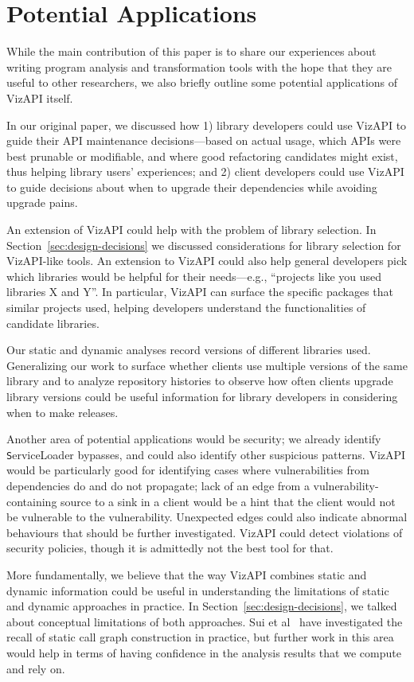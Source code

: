 \section{Potential Applications}
\label{sec:potential-applications}
While the main contribution of this paper is to share our experiences
about writing program analysis and transformation tools with the hope
that they are useful to other researchers, we also briefly outline
some potential applications of VizAPI itself.

In our original paper, we discussed how 1) library developers could
use VizAPI to guide their API maintenance decisions---based on actual
usage, which APIs were best prunable or modifiable, and where good
refactoring candidates might exist, thus helping library users'
experiences; and 2) client developers could use VizAPI to guide
decisions about when to upgrade their dependencies while avoiding
upgrade pains.

An extension of VizAPI could help with the problem of library selection. In
Section~\ref{sec:design-decisions} we discussed considerations for library
selection for VizAPI-like tools. An extension to VizAPI could also help
general developers pick which libraries would be helpful for their
needs---e.g., ``projects like you used libraries X and Y''. In particular,
VizAPI can surface the specific packages that similar projects used,
helping developers understand the functionalities of candidate libraries.

Our static and dynamic analyses record versions of different libraries used. 
Generalizing our work to surface whether clients use multiple versions of the same library and
to analyze repository histories to observe how often clients upgrade library versions 
could be useful information for library developers in considering when to make releases.

Another area of potential applications would be security; we already
identify {\texttt ServiceLoader} bypasses, and could also identify
other suspicious patterns. VizAPI would be particularly good for
identifying cases where vulnerabilities from dependencies do and do
not propagate; lack of an edge from a vulnerability-containing source
to a sink in a client would be a hint that the client would not be
vulnerable to the vulnerability. Unexpected edges could also indicate
abnormal behaviours that should be further investigated.
VizAPI could detect violations of
security policies, though it is admittedly not the best tool for that.

More fundamentally, we believe that the way VizAPI combines static and
dynamic information could be useful in understanding the limitations
of static and dynamic approaches in practice. In
Section~\ref{sec:design-decisions}, we talked about conceptual
limitations of both approaches. Sui et
al~\cite{sui20:_recal_static_call_graph_const_pract} have investigated
the recall of static call graph construction in practice, but further
work in this area would help in terms of having confidence in the
analysis results that we compute and rely on.

